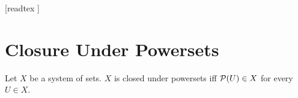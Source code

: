 \documentclass[10pt]{article}
\begin{document}
  \begin{imports}
    \begin{forthel}
      [readtex ]
    \end{forthel}
  \end{imports}


  \section*{Closure Under Powersets}

  \begin{forthel}
    \begin{definition}
      Let $X$ be a system of sets.
      $X$ is closed under powersets iff $\mathcal{P}(U) \in X$ for every $U \in X$.
    \end{definition}
  \end{forthel}
\end{document}
